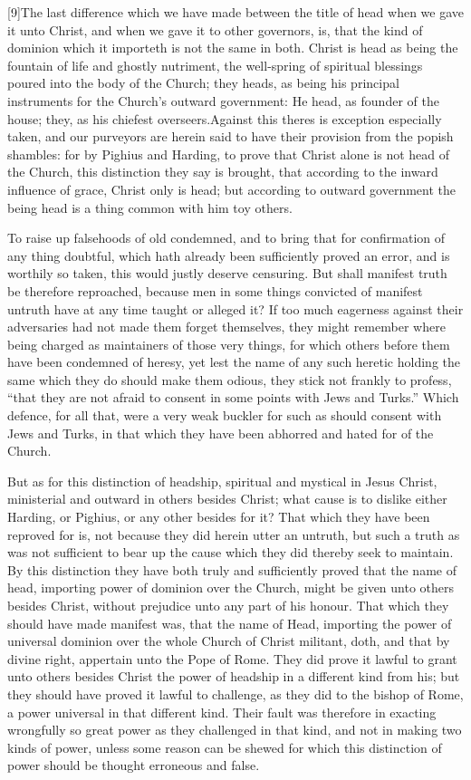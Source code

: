 [9]The last difference which we have made between the title of head when we gave it unto Christ, and when we gave it to other governors, is, that the kind of dominion which it importeth is not the same in both. Christ is head as being the fountain of life and ghostly nutriment, the well-spring of spiritual blessings poured into the body of the Church; they heads, as being his principal instruments for the Church’s outward government: He head, as founder of the house; they, as his chiefest overseers.Against this theres is exception especially taken, and our purveyors are herein said to have their provision from the popish shambles: for by  Pighius and Harding, to prove that Christ alone is not head of the Church, this distinction they say is brought, that according to the inward influence of grace, Christ only is head; but according to outward government the being head is a thing common with him toy others.

To raise up falsehoods of old condemned, and to bring that for confirmation of any thing doubtful, which hath already been sufficiently proved an error, and is worthily so taken, this would justly deserve censuring. But shall manifest truth be therefore reproached, because men in some things convicted of manifest untruth have at any time taught or alleged it? If too much eagerness against their adversaries had not made them forget themselves, they might remember where being charged as maintainers of those very things, for which others before them have been condemned of heresy, yet lest the name of any such heretic holding the same which they do should make them odious, they stick not frankly to profess, “that they are not afraid to consent in some points with Jews and Turks.” Which defence, for all that, were a very weak buckler for such as should consent with Jews and Turks, in that which they have been abhorred and hated for of the Church.

But as for this distinction of headship, spiritual and mystical in Jesus Christ, ministerial and outward in others besides Christ; what cause is to dislike either Harding, or Pighius, or any other besides for it? That which they have been reproved for is, not because they did herein utter an untruth, but such a truth as was not sufficient to bear up the cause which they did thereby seek to maintain. By this distinction they have both truly and sufficiently proved that the name of head, importing power of dominion over the Church, might be given unto others besides Christ, without prejudice unto any part of his honour. That which they should have made  manifest was, that the name of Head, importing the power of universal dominion over the whole Church of Christ militant, doth, and that by divine right, appertain unto the Pope of Rome. They did prove it lawful to grant unto others besides Christ the power of headship in a different kind from his; but they should have proved it lawful to challenge, as they did to the bishop of Rome, a power universal in that different kind. Their fault was therefore in exacting wrongfully so great power as they challenged in that kind, and not in making two kinds of power, unless some reason can be shewed for which this distinction of power should be thought erroneous and false.

